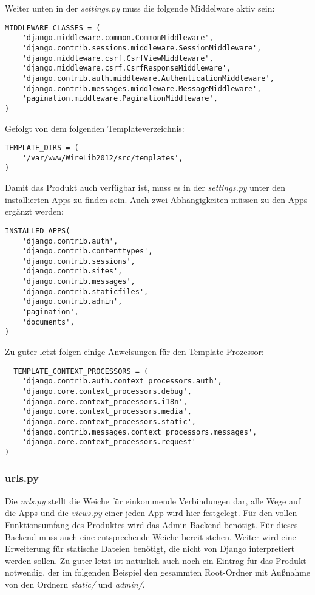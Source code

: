 Weiter unten in der \emph{settings.py} muss die folgende Middelware aktiv sein:
\begin{lstlisting}
MIDDLEWARE_CLASSES = (
    'django.middleware.common.CommonMiddleware',
    'django.contrib.sessions.middleware.SessionMiddleware',
    'django.middleware.csrf.CsrfViewMiddleware',
    'django.middleware.csrf.CsrfResponseMiddleware',
    'django.contrib.auth.middleware.AuthenticationMiddleware',
    'django.contrib.messages.middleware.MessageMiddleware',
    'pagination.middleware.PaginationMiddleware',
)
\end{lstlisting}

Gefolgt von dem folgenden Templateverzeichnis:
\begin{lstlisting}
TEMPLATE_DIRS = (
    '/var/www/WireLib2012/src/templates',
)
\end{lstlisting}

Damit das Produkt auch verfügbar ist, muss es in der \emph{settings.py} unter
den installierten Apps zu finden sein. Auch zwei Abhängigkeiten müssen zu den
Apps ergänzt werden:
\begin{lstlisting}
INSTALLED_APPS(
    'django.contrib.auth',
    'django.contrib.contenttypes',
    'django.contrib.sessions',
    'django.contrib.sites',
    'django.contrib.messages',
    'django.contrib.staticfiles',
    'django.contrib.admin',
    'pagination',
    'documents',
)
\end{lstlisting}

Zu guter letzt folgen einige Anweisungen für den Template Prozessor:
\begin{lstlisting}
  TEMPLATE_CONTEXT_PROCESSORS = (
    'django.contrib.auth.context_processors.auth',
    'django.core.context_processors.debug',
    'django.core.context_processors.i18n',
    'django.core.context_processors.media',
    'django.core.context_processors.static',
    'django.contrib.messages.context_processors.messages',
    'django.core.context_processors.request'
)
\end{lstlisting}

\subsubsection{urls.py}
Die \emph{urls.py} stellt die Weiche für einkommende Verbindungen dar, alle
Wege auf die Apps und die \emph{views.py} einer jeden App  wird hier
festgelegt.  Für den vollen Funktionsumfang des Produktes wird das
Admin-Backend benötigt. Für dieses Backend muss auch eine entsprechende Weiche
bereit stehen. Weiter wird eine Erweiterung für statische Dateien benötigt, die
nicht von Django interpretiert werden sollen. Zu guter letzt ist natürlich auch
noch ein Eintrag für das Produkt notwendig, der im folgenden Beispiel den
gesammten Root-Ordner mit Außnahme von den Ordnern \emph{static/} und
\emph{admin/}.

